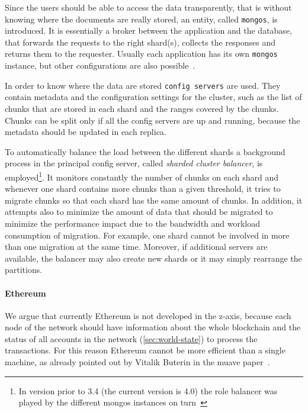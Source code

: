Since the users should be able to access the data transparently, that is without
knowing where the documents are really stored, an entity, called
\texttt{mongos}, is introduced. It is essentially a broker between the 
application and the database, that forwards the requests to the right shard(s), 
collects the responses and returns them to the requester. Usually each 
application has its own \texttt{mongos} instance, but other configurations are 
also possible~\cite{bib:mongodb}.

In order to know where the data are stored \texttt{config servers} are
used. They contain metadata and the configuration settings for the 
cluster, such as the list of chunks that are stored in each shard and the ranges
covered by the chunks. Chunks can be split only if all the config servers are 
up and running, because the metadata should be updated in each replica.

To automatically balance the load between the different shards a background 
process in the principal config server, called \emph{sharded cluster balancer}, 
is  employed\footnote{In version prior to 3.4 (the current version 
is 4.0) the role balancer was played by the different mongos instances on 
turn~\cite{bib:mongodb-docs}}. It monitors constantly the number of chunks on
each shard and  whenever one  shard contains more chunks than a given 
threshold, it tries to migrate chunks so that each shard has the same amount of 
chunks. In addition, it attempts also to minimize the amount of data that 
should be migrated to minimize the performance impact due to the bandwidth and 
workload consumption of migration. For example, one shard cannot be involved in 
more than one migration at the same time. Moreover, if additional servers are 
available, the balancer may also create new shards or it may simply rearrange
the partitions.






\paragraph{Ethereum} We argue that currently Ethereum is not developed in the
z-axis, because each node of the network should have information about the whole
blockchain and the status of all accounts in the network 
(\autoref{sec:world-state}) to process the transactions. For this reason 
Ethereum cannot be more efficient than a single machine, as already pointed out 
by Vitalik Buterin in the muave paper~\cite{bib:mauve}.

